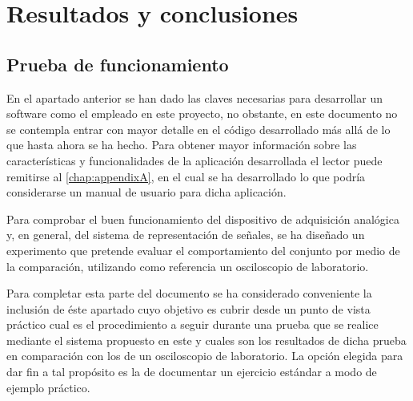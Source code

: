 \chapter{Resultados y conclusiones}\label{chap:part1conclusions}

\section{Prueba de funcionamiento}\label{sec:working-test}

En el apartado anterior se han dado las claves necesarias para desarrollar un software como el empleado en este proyecto, no obstante, en este documento no se contempla entrar con mayor detalle en el código desarrollado más allá de lo que hasta ahora se ha hecho. Para obtener mayor información sobre las características y funcionalidades de la aplicación desarrollada el lector puede remitirse al \vref{chap:appendixA}, en el cual se ha desarrollado lo que podría considerarse un manual de usuario para dicha aplicación.\par
Para comprobar el buen funcionamiento del dispositivo de adquisición analógica y, en general, del sistema de representación de señales, se ha diseñado un experimento que pretende evaluar el comportamiento del conjunto por medio de la comparación, utilizando como referencia un osciloscopio de laboratorio.\par
Para completar esta parte del documento se ha considerado conveniente la inclusión de éste apartado cuyo objetivo es cubrir desde un punto de vista práctico cual es el procedimiento a seguir durante una prueba que se realice mediante el sistema propuesto en este  y cuales son los resultados de dicha prueba en comparación con los de un osciloscopio de laboratorio. La opción elegida para dar fin a tal propósito es la de documentar un ejercicio estándar a modo de ejemplo práctico.\par


